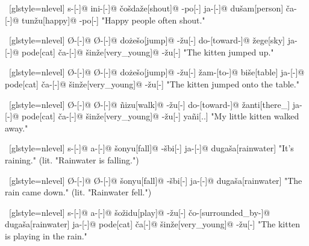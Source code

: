 \ex~[glstyle=nlevel]
\begingl
\glpreamble {}
\endpreamble
s-[{\Ind}-]@
ini-[{\Hab}-]@
\v{c}o\v{s}da\v{z}e[shout]@
-po[-{\Hg}]
ja-[{\Nom}-]@
du\v{s}am[person]
\v{c}a-[{\Nom}-]@
tun\v{z}u[happy]@
-po[-{\Hg}]
\glft "Happy people often shout."
\endgl
\xe

\ex~[glstyle=nlevel]
\begingl
\glpreamble {}
\endpreamble
Ø-[{\Ind}-]@
Ø-[{\Pfv}-]@
do\.{z}e\v{s}o[jump]@
-\v{z}u[-{\An}]
do-[toward-]@
\v{z}ege[sky]
ja-[{\Nom}-]@
pode[cat]
\v{c}a-[{\Nom}-]@
\v{s}in\v{z}e[very\_young]@
-\v{z}u[-{\An}]
\glft "The kitten jumped up."
\endgl
\xe

\ex~[glstyle=nlevel]
\begingl
\glpreamble {}
\endpreamble
Ø-[{\Ind}-]@
Ø-[{\Pfv}-]@
do\.{z}e\v{s}o[jump]@
-\v{z}u[-{\An}]
\v{z}am-[to-]@
bi\v{s}e[table]
ja-[{\Nom}-]@
pode[cat]
\v{c}a-[{\Nom}-]@
\v{s}in\v{z}e[very\_young]@
-\v{z}u[-{\An}]
\glft "The kitten jumped onto the table."
\endgl
\xe

\ex~[glstyle=nlevel]
\begingl
\glpreamble {}
\endpreamble
Ø-[{\Ind}-]@
Ø-[{\Pfv}-]@
ñizu[walk]@
-\v{z}u[-{\An}]
do-[toward-]@
\v{z}anti[there\_{\Dist}]
ja-[{\Nom}-]@
pode[cat]
\v{c}a-[{\Nom}-]@
\v{s}in\v{z}e[very\_young]@
-\v{z}u[-{\An}]
yañi[{\Fex}.{\Hg}.{\Gen}]
\glft "My little kitten walked away."
\endgl
\xe

\ex~[glstyle=nlevel]
\begingl
\glpreamble {}
\endpreamble
s-[{\Ind}-]@
a-[{\Prog}-]@
\v{s}onyu[fall]@
-\v{s}bi[-{\Inan}]
ja-[{\Nom}-]@
duga\v{s}a[rainwater]
\glft "It's raining." (lit. "Rainwater is falling.")
\endgl
\xe

\ex~[glstyle=nlevel]
\begingl
\glpreamble {}
\endpreamble
Ø-[{\Ind}-]@
Ø-[{\Pfv}-]@
\v{s}onyu[fall]@
-\v{s}bi[-{\Inan}]
ja-[{\Nom}-]@
duga\v{s}a[rainwater]
\glft "The rain came down." (lit. "Rainwater fell.")
\endgl
\xe

\ex~[glstyle=nlevel]
\begingl
\glpreamble {}
\endpreamble
s-[{\Ind}-]@
a-[{\Prog}-]@
\v{s}o\v{z}idu[play]@
-\v{z}u[-{\An}]
\v{c}o-[surrounded\_by-]@
duga\v{s}a[rainwater]
ja-[{\Nom}-]@
pode[cat]
\v{c}a[{\Nom}-]@
\v{s}in\v{z}e[very\_young]@
-\v{z}u[-{\An}]
\glft "The kitten is playing in the rain."
\endgl
\xe

